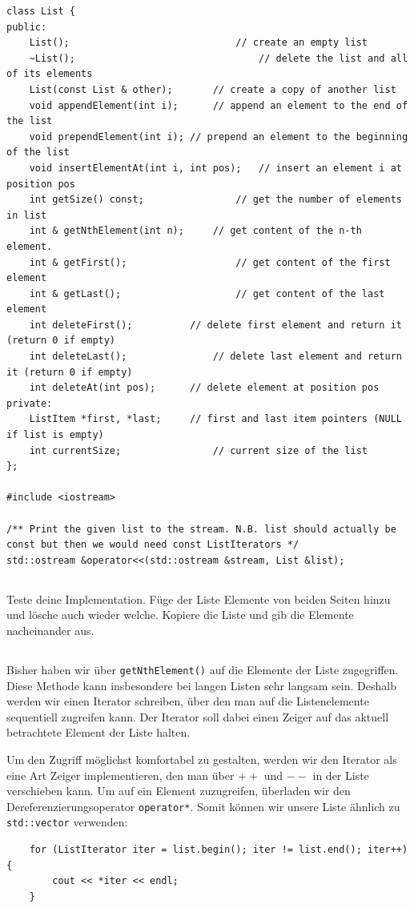 \begin{lstlisting}
class List {
public:
	List();								// create an empty list
	~List();								// delete the list and all of its elements
	List(const List & other);		// create a copy of another list
	void appendElement(int i);		// append an element to the end of the list
	void prependElement(int i);	// prepend an element to the beginning of the list
	void insertElementAt(int i, int pos);	// insert an element i at position pos
	int getSize() const;				// get the number of elements in list
	int & getNthElement(int n);		// get content of the n-th element.
	int & getFirst();					// get content of the first element
	int & getLast();					// get content of the last element
	int deleteFirst();			// delete first element and return it (return 0 if empty)
	int deleteLast();				// delete last element and return it (return 0 if empty)
	int deleteAt(int pos);		// delete element at position pos
private:
	ListItem *first, *last;		// first and last item pointers (NULL if list is empty)
	int currentSize;				// current size of the list
};

#include <iostream>

/** Print the given list to the stream. N.B. list should actually be const but then we would need const ListIterators */
std::ostream &operator<<(std::ostream &stream, List &list);
\end{lstlisting}

\subsection{}
Teste deine Implementation.
Füge der Liste Elemente von beiden Seiten hinzu und lösche auch wieder welche.
Kopiere die Liste und gib die Elemente nacheinander aus.

\subsection{}
Bisher haben wir über \texttt{getNthElement()} auf die Elemente der Liste zugegriffen.
Diese Methode kann insbesondere bei langen Listen sehr langsam sein.
Deshalb werden wir einen Iterator schreiben, über den man auf die Listenelemente sequentiell zugreifen kann.
Der Iterator soll dabei einen Zeiger auf das aktuell betrachtete Element der Liste halten.

Um den Zugriff möglichst komfortabel zu gestalten, werden wir den Iterator als eine Art Zeiger implementieren, den man über \textbf{$++$} und \textbf{$--$} in der Liste verschieben kann.
Um auf ein Element zuzugreifen, überladen wir den Dereferenzierungsoperator \texttt{operator*}.
Somit können wir unsere Liste ähnlich zu \texttt{std::vector} verwenden:
\begin{lstlisting}
	for (ListIterator iter = list.begin(); iter != list.end(); iter++) {
		cout << *iter << endl;
	}
\end{lstlisting}


